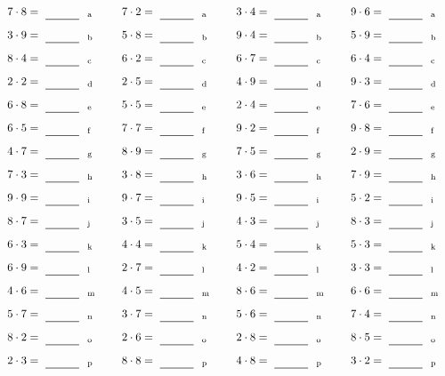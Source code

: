 \documentclass
[
  draft    = true,
  fontsize = 11pt,
  parskip  = half-
]
{scrartcl}
\begin{document}
\par\vfill\par
\begin{align*}
    \pline{7\cdot8}&=\rline{a}
  & \pline{7\cdot2}&=\rline{a}
  & \pline{3\cdot4}&=\rline{a}
  & \pline{9\cdot6}&=\rline{a} \\[1ex]
    \pline{3\cdot9}&=\rline{b}
  & \pline{5\cdot8}&=\rline{b}
  & \pline{9\cdot4}&=\rline{b}
  & \pline{5\cdot9}&=\rline{b} \\[1ex]
    \pline{8\cdot4}&=\rline{c}
  & \pline{6\cdot2}&=\rline{c}
  & \pline{6\cdot7}&=\rline{c}
  & \pline{6\cdot4}&=\rline{c} \\[1ex]
    \pline{2\cdot2}&=\rline{d}
  & \pline{2\cdot5}&=\rline{d}
  & \pline{4\cdot9}&=\rline{d}
  & \pline{9\cdot3}&=\rline{d} \\[1ex]
    \pline{6\cdot8}&=\rline{e}
  & \pline{5\cdot5}&=\rline{e}
  & \pline{2\cdot4}&=\rline{e}
  & \pline{7\cdot6}&=\rline{e} \\[1ex]
    \pline{6\cdot5}&=\rline{f}
  & \pline{7\cdot7}&=\rline{f}
  & \pline{9\cdot2}&=\rline{f}
  & \pline{9\cdot8}&=\rline{f} \\[1ex]
    \pline{4\cdot7}&=\rline{g}
  & \pline{8\cdot9}&=\rline{g}
  & \pline{7\cdot5}&=\rline{g}
  & \pline{2\cdot9}&=\rline{g} \\[1ex]
    \pline{7\cdot3}&=\rline{h}
  & \pline{3\cdot8}&=\rline{h}
  & \pline{3\cdot6}&=\rline{h}
  & \pline{7\cdot9}&=\rline{h} \\[1ex]
    \pline{9\cdot9}&=\rline{i}
  & \pline{9\cdot7}&=\rline{i}
  & \pline{9\cdot5}&=\rline{i}
  & \pline{5\cdot2}&=\rline{i} \\[1ex]
    \pline{8\cdot7}&=\rline{j}
  & \pline{3\cdot5}&=\rline{j}
  & \pline{4\cdot3}&=\rline{j}
  & \pline{8\cdot3}&=\rline{j} \\[1ex]
    \pline{6\cdot3}&=\rline{k}
  & \pline{4\cdot4}&=\rline{k}
  & \pline{5\cdot4}&=\rline{k}
  & \pline{5\cdot3}&=\rline{k} \\[1ex]
    \pline{6\cdot9}&=\rline{l}
  & \pline{2\cdot7}&=\rline{l}
  & \pline{4\cdot2}&=\rline{l}
  & \pline{3\cdot3}&=\rline{l} \\[1ex]
    \pline{4\cdot6}&=\rline{m}
  & \pline{4\cdot5}&=\rline{m}
  & \pline{8\cdot6}&=\rline{m}
  & \pline{6\cdot6}&=\rline{m} \\[1ex]
    \pline{5\cdot7}&=\rline{n}
  & \pline{3\cdot7}&=\rline{n}
  & \pline{5\cdot6}&=\rline{n}
  & \pline{7\cdot4}&=\rline{n} \\[1ex]
    \pline{8\cdot2}&=\rline{o}
  & \pline{2\cdot6}&=\rline{o}
  & \pline{2\cdot8}&=\rline{o}
  & \pline{8\cdot5}&=\rline{o} \\[1ex]
    \pline{2\cdot3}&=\rline{p}
  & \pline{8\cdot8}&=\rline{p}
  & \pline{4\cdot8}&=\rline{p}
  & \pline{3\cdot2}&=\rline{p}
\end{align*}
\end{document}
